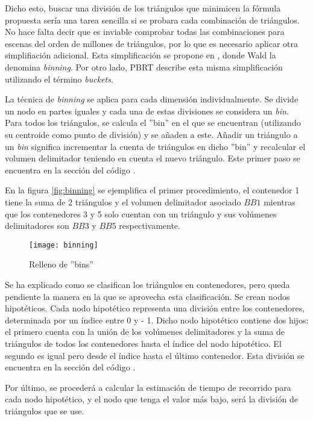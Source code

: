 Dicho esto, buscar una división de los triángulos que minimicen la fórmula propuesta sería una tarea sencilla si se probara cada combinación de triángulos. No hace falta decir que es inviable comprobar todas las combinaciones para escenas del orden de millones de triángulos, por lo que es necesario aplicar otra simplifiación adicional. Esta simplificación se propone en \cite{wald2007fast}, donde Wald la denomina \emph{binning}. Por otro lado, PBRT \cite{pharr2016physically} describe esta misma simplificación utilizando el término \emph{buckets}.

La técnica de \emph{binning} se aplica para cada dimensión individualmente. Se divide un nodo en  partes iguales y cada una de estas divisiones se considera un \emph{bin}. Para todos los triángulos, se calcula el ''bin'' en el que se encuentran (utilizando su centroide como punto de división) y se añaden a este. Añadir un triángulo a un \emph{bin} significa incrementar la cuenta de triángulos en dicho ''bin'' y recalcular el volumen delimitador teniendo en cuenta el nuevo triángulo. Este primer paso se encuentra en la sección del código .

En la figura \autoref{fig:binning} se ejemplifica el primer procedimiento, el contenedor 1 tiene la suma de 2 triángulos y el volumen delimitador asociado $BB1$ mientras que los contenedores 3 y 5 solo cuentan con un triángulo y sus volúmenes delimitadores son $BB3$ y $BB5$ respectivamente.

\begin{figure}[H]
    \centering
	\texttt{[image: binning]}
	\caption{Relleno de ''bins''}
	\label{fig:binning}
\end{figure}

Se ha explicado como se clasifican los triángulos en contenedores, pero queda pendiente la manera en la que se aprovecha esta clasificación. Se crean  nodos hipotéticos. Cada nodo hipotético representa una división entre los contenedores, determinada por un índice entre 0 y  - 1. Dicho nodo hipotético contiene dos hijos: el primero cuenta con la unión de los volúmenes delimitadores y la suma de triángulos de todos los contenedores hasta el índice del nodo hipotético. El segundo es igual pero desde el índice hasta el último contenedor. Esta división se encuentra en la sección del código .

Por último, se procederá a calcular la estimación de tiempo de recorrido para cada nodo hipotético, y el nodo que tenga el valor más bajo, será la división de triángulos que se use.


